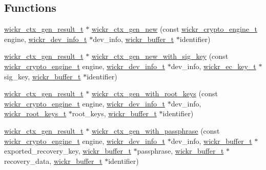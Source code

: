 \subsection*{Functions}
\begin{DoxyCompactItemize}
\item 
\hyperlink{structwickr__ctx__gen__result}{wickr\+\_\+ctx\+\_\+gen\+\_\+result\+\_\+t} $\ast$ \hyperlink{group__wickr__ctx_gaa8904ab3687a22f8d291f5976d05a0e5}{wickr\+\_\+ctx\+\_\+gen\+\_\+new} (const \hyperlink{structwickr__crypto__engine}{wickr\+\_\+crypto\+\_\+engine\+\_\+t} engine, \hyperlink{structwickr__dev__info}{wickr\+\_\+dev\+\_\+info\+\_\+t} $\ast$dev\+\_\+info, \hyperlink{structwickr__buffer}{wickr\+\_\+buffer\+\_\+t} $\ast$identifier)
\item 
\hyperlink{structwickr__ctx__gen__result}{wickr\+\_\+ctx\+\_\+gen\+\_\+result\+\_\+t} $\ast$ \hyperlink{group__wickr__ctx_ga458f74fb060fb98da491d733e51fc3ef}{wickr\+\_\+ctx\+\_\+gen\+\_\+new\+\_\+with\+\_\+sig\+\_\+key} (const \hyperlink{structwickr__crypto__engine}{wickr\+\_\+crypto\+\_\+engine\+\_\+t} engine, \hyperlink{structwickr__dev__info}{wickr\+\_\+dev\+\_\+info\+\_\+t} $\ast$dev\+\_\+info, \hyperlink{structwickr__ec__key}{wickr\+\_\+ec\+\_\+key\+\_\+t} $\ast$sig\+\_\+key, \hyperlink{structwickr__buffer}{wickr\+\_\+buffer\+\_\+t} $\ast$identifier)
\item 
\hyperlink{structwickr__ctx__gen__result}{wickr\+\_\+ctx\+\_\+gen\+\_\+result\+\_\+t} $\ast$ \hyperlink{group__wickr__ctx_ga286a513a606b6643f796539413357c34}{wickr\+\_\+ctx\+\_\+gen\+\_\+with\+\_\+root\+\_\+keys} (const \hyperlink{structwickr__crypto__engine}{wickr\+\_\+crypto\+\_\+engine\+\_\+t} engine, \hyperlink{structwickr__dev__info}{wickr\+\_\+dev\+\_\+info\+\_\+t} $\ast$dev\+\_\+info, \hyperlink{structwickr__root__keys}{wickr\+\_\+root\+\_\+keys\+\_\+t} $\ast$root\+\_\+keys, \hyperlink{structwickr__buffer}{wickr\+\_\+buffer\+\_\+t} $\ast$identifier)
\item 
\hyperlink{structwickr__ctx__gen__result}{wickr\+\_\+ctx\+\_\+gen\+\_\+result\+\_\+t} $\ast$ \hyperlink{group__wickr__ctx_gaab0b2731d76d6ea91afd1b147c53a29a}{wickr\+\_\+ctx\+\_\+gen\+\_\+with\+\_\+passphrase} (const \hyperlink{structwickr__crypto__engine}{wickr\+\_\+crypto\+\_\+engine\+\_\+t} engine, \hyperlink{structwickr__dev__info}{wickr\+\_\+dev\+\_\+info\+\_\+t} $\ast$dev\+\_\+info, \hyperlink{structwickr__buffer}{wickr\+\_\+buffer\+\_\+t} $\ast$exported\+\_\+recovery\+\_\+key, \hyperlink{structwickr__buffer}{wickr\+\_\+buffer\+\_\+t} $\ast$passphrase, \hyperlink{structwickr__buffer}{wickr\+\_\+buffer\+\_\+t} $\ast$recovery\+\_\+data, \hyperlink{structwickr__buffer}{wickr\+\_\+buffer\+\_\+t} $\ast$identifier)

\end{DoxyCompactItemize}
